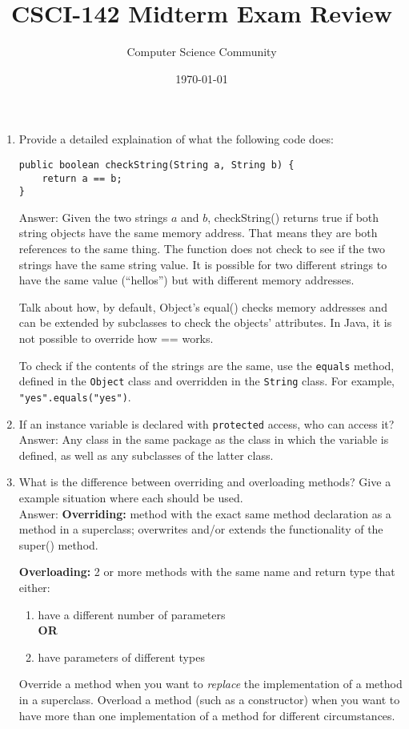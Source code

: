 \documentclass[11pt]{article}
\title{CSCI-142 Midterm Exam Review}
\author{Computer Science Community}
\date{\today}
\newenvironment{answer}{\large\lstset{basicstyle=\large\ttfamily}\color{white} \small{Answer:}}{}
\newenvironment{answer}{\large\lstset{basicstyle=\large\ttfamily}\color{red} \small{Answer:}}{}
\begin{document}
\header
\begin{enumerate}



\item Provide a detailed explaination of what the following code does:
\begin{lstlisting}
public boolean checkString(String a, String b) {
	return a == b;
}
\end{lstlisting}
\begin{answer}
Given the two strings $a$ and $b$, checkString() returns true if both string objects have the same memory address.  That means they are both references to the same thing.  The function does not check to see if the two strings have the same string value.  It is possible for two different strings to have the same value (``hellos'') but with different memory addresses.  

Talk about how, by default, Object's equal() checks memory addresses and can be extended by subclasses to check the objects' attributes.  In Java, it is not possible to override how == works.

To check if the contents of the strings are the same, use the {\tt equals} method, defined in the {\tt Object} class and overridden in the {\tt String} class.
For example, {\tt "yes".equals("yes")}.
\end{answer}

\item If an instance variable is declared with {\tt protected} access, who can access it? \\
\begin{answer}
Any class in the same package as the class in which the variable is defined, as well as any subclasses of the latter class.
\end{answer}


\item What is the difference between overriding and overloading methods?  Give a example situation where each should be used. \\
\begin{answer}
\textbf{Overriding:} method with the exact same method declaration as a method in a superclass; overwrites and/or extends the functionality of the super() method.

\textbf{Overloading:} 2 or more methods with the same name and return type that either:
	\begin{enumerate}
	\item have a different number of parameters\\ \textbf{OR}
	\item have parameters of different types
	\end{enumerate}
Override a method when you want to \textit{replace} the implementation of a method in a superclass.  Overload a method (such as a constructor) when you want to have more than one implementation of a method for different circumstances.
\end{answer}



\end{enumerate}
\end{document}
